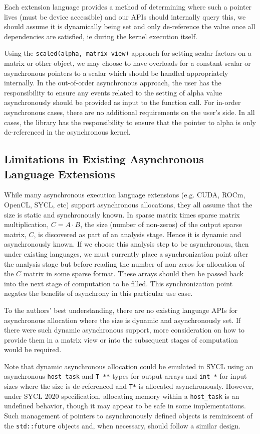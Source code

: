 \documentclass{article}
\begin{document}
Each extension language provides a method of determining where such a pointer lives (must be device accessible) and our APIs should internally query this, we should assume it is dynamically being set and only de-reference the value once all dependencies are satisfied, ie during the kernel execution itself. 

Using the \verb|scaled(alpha, matrix_view)| approach for setting scalar factors on a matrix or other object, we may choose to have overloads for a constant scalar or asynchronous pointers to a scalar which should be handled appropriately internally.  In the out-of-order asynchronous approach, the user has the responsibility to ensure any events related to the setting of alpha value asynchronously should be provided as input to the function call.  For in-order asynchronous cases, there are no additional requirements on the user's side.  In all cases, the library has the responsibility to ensure that the pointer to alpha is only de-referenced in the asynchronous kernel.

\subsection{Limitations in Existing Asynchronous Language Extensions}

While many asynchronous execution language extensions (e.g. CUDA, ROCm, OpenCL, SYCL, etc) support asynchronous allocations, they all assume that the size is static and synchronously known.  In sparse matrix times sparse matrix multiplication, $C = A \cdot B$, the size (number of non-zeros) of the output sparse matrix, $C$, is discovered as part of an analysis stage. Hence it is dynamic and asynchronously known.  If we choose this analysis step to be asynchronous, then under existing languages, we must currently place a synchronization point after the analysis stage but before reading the number of non-zeros for allocation of the $C$ matrix in some sparse format. These arrays should then be passed back into the next stage of computation to be filled. This synchronization point negates the benefits of asynchrony in this particular use case.

To the authors' best understanding, there are no existing language APIs for asynchronous allocation where the size is dynamic and asynchronously set. If there were such dynamic asynchronous support, more consideration on how to provide them in a matrix view or into the subsequent stages of computation would be required.

Note that dynamic asynchronous allocation could be emulated in SYCL using an asynchronous \verb|host_task| and \verb|T **| types for output arrays and \verb|int *| for input sizes where the size is de-referenced and \verb|T*| is allocated asynchronously. However, under SYCL 2020 specification, allocating memory within a \verb|host_task| is an undefined behavior, though it may appear to be safe in some implementations. Such management of pointers to asynchronously defined objects is reminiscent of the \verb|std::future| objects and, when necessary, should follow a similar design.
\fi
\end{document}
